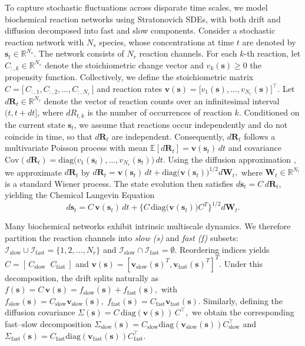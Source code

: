 \documentclass{article}
\begin{document}
To capture stochastic fluctuations across disparate time scales, we model biochemical reaction networks using Stratonovich SDEs, with both drift and diffusion decomposed into fast and slow components.
Consider a stochastic reaction network with $N_s$ species, whose concentrations at time $t$ are denoted by
$\pmb{s}_t\in\mathbb{R}^{N_s}$. The network consists of $N_r$ reaction channels.
For each $k$-th reaction, let $C_{:,k}\in\mathbb{R}^{N_s}$ denote the stoichiometric
change vector and $v_k(\pmb{s})\ge 0$ the propensity function. Collectively, we define the stoichiometric matrix
$
C = \big[\, C_{:,1}, C_{:,2}, \ldots, C_{:,N_r}\,\big]$ and reaction rates $ 
\pmb{v}(\pmb{s})=\big[v_1(\pmb{s}), \ldots, v_{N_r}(\pmb{s})\big]^\top.$ Let $d\pmb{R}_t\in\mathbb{R}^{N_r}$ denote the vector of reaction counts over
an infinitesimal interval $(t,t+dt]$, where $dR_{t,k}$ is the number of
occurrences of reaction $k$. Conditioned on the current state $\pmb{s}_t$,
we assume that reactions occur independently and do not coincide in time, so that
$d\pmb{R}_t$ are independent. Consequently, $d\pmb{R}_t$ follows a multivariate Poisson process with
mean $\mathbb{E}[d\pmb{R}_t]=\pmb{v}(\pmb{s}_t)\,dt$ and covariance
$\mathrm{Cov}(d\pmb{R}_t)=
\mathrm{diag}\!\big(v_1(\pmb{s}_t),\ldots,v_{N_r}(\pmb{s}_t)\big)\,dt.$
Using the diffusion approximation \cite{gillespie2000chemical}, we approximate $d\pmb{R}_t$ by
\(
d\pmb{R}_t
=
\pmb{v}(\pmb{s}_t)\,dt
+
\mathrm{diag}\!\big(\pmb{v}(\pmb{s}_t)\big)^{1/2} d\pmb{W}_t,
\)
where $\pmb{W}_t\in\mathbb{R}^{N_r}$ is a standard Wiener process. The state evolution then satisfies
\(
d\pmb{s}_t = C\,d\pmb{R}_t
\), 
yielding the Chemical Langevin Equation
\[
d\pmb{s}_t
=
C\,\pmb{v}(\pmb{s}_t)\,dt
+
\{C\,\mathrm{diag}\!\big(\pmb{v}(\pmb{s}_t)\big)C^T\}^{1/2} d\pmb{W}_t.
\]

Many biochemical networks exhibit intrinsic multiscale dynamics. We therefore partition the reaction channels into \emph{slow (s)} and \emph{fast (f)} subsets: $\mathcal{I}_{\mathrm{slow}}\cup\mathcal{I}_{\mathrm{fast}}=\{1,2,\ldots,N_r\}$
and $\mathcal{I}_{\mathrm{slow}}\cap\mathcal{I}_{\mathrm{fast}}=\emptyset$.
Reordering indices yields
$
C=[\,C_{\mathrm{slow}}\;\;C_{\mathrm{fast}}\,]$ and $
\pmb{v}(\pmb{s})
=
[
\pmb{v}_{\mathrm{slow}}(\pmb{s})^T,
\pmb{v}_{\mathrm{fast}}(\pmb{s})^T
]^T.$
Under this decomposition, the drift splits naturally as
\(
f(\pmb{s}) = C\,\pmb{v}(\pmb{s})
= f_{\mathrm{slow}}(\pmb{s}) + f_{\mathrm{fast}}(\pmb{s}),
\)
with
\(
f_{\mathrm{slow}}(\pmb{s}) = C_{\mathrm{slow}}\pmb{v}_{\mathrm{slow}}(\pmb{s}),\;
f_{\mathrm{fast}}(\pmb{s}) = C_{\mathrm{fast}}\pmb{v}_{\mathrm{fast}}(\pmb{s}).
\)
Similarly, defining the diffusion covariance
\(
\Sigma(\pmb{s}) = C\,\mathrm{diag}(\pmb{v}(\pmb{s}))\,C^\top,
\)
we obtain the corresponding fast–slow decomposition
$
\Sigma_{\mathrm{slow}}(\pmb{s})
= C_{\mathrm{slow}}\mathrm{diag}(\pmb{v}_{\mathrm{slow}}(\pmb{s}))C_{\mathrm{slow}}^\top$ and 
$\Sigma_{\mathrm{fast}}(\pmb{s})
= C_{\mathrm{fast}}\mathrm{diag}(\pmb{v}_{\mathrm{fast}}(\pmb{s}))C_{\mathrm{fast}}^\top.
$
\end{document}
